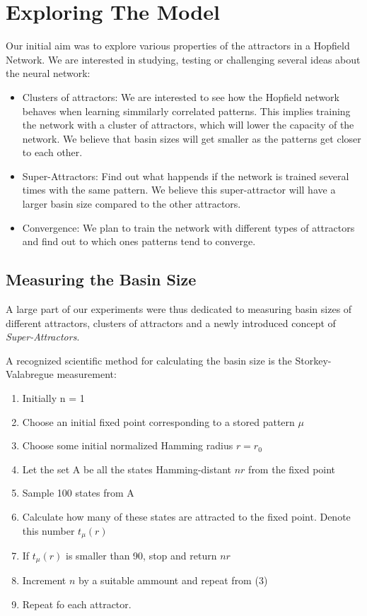 \chapter{Exploring The Model}

Our initial aim was to explore various properties of the attractors in a Hopfield Network. We are interested in studying, testing or challenging several ideas about the neural network:
\begin{itemize}
 \item Clusters of attractors: We are interested to see how the Hopfield network behaves when learning simmilarly correlated patterns. This implies training the network with a cluster of attractors, which will lower the capacity of the network. We believe that basin sizes will get smaller as the patterns get closer to each other. 
 \item Super-Attractors: Find out what happends if the network is trained several times with the same pattern. We believe this super-attractor will have a larger basin size compared to the other attractors.
 \item Convergence: We plan to train the network with different types of attractors and find out to which ones patterns tend to converge.  
\end{itemize}


\section{Measuring the Basin Size}

 A large part of our experiments were thus dedicated to measuring basin sizes of different attractors, clusters of attractors and a newly introduced concept of \emph{Super-Attractors}. 
 
 A recognized scientific method for calculating the basin size is the Storkey-Valabregue measurement:
 
 \begin{enumerate}
  \item Initially n = 1
  \item Choose an initial fixed point corresponding to a stored pattern \(\mu\)
  \item Choose some initial normalized Hamming radius \(r=r_{0}\)
  \item Let the set A be all the states Hamming-distant \( nr \) from the fixed point
  \item Sample 100 states from A
  \item Calculate how many of these states are attracted to the fixed point. Denote this number \( t_{\mu}(r) \)
  \item If \( t_{\mu}(r) \) is smaller than 90, stop and return \(nr\)
  \item Increment \(n\) by a suitable ammount and repeat from (3)
  \item Repeat fo each attractor.
 \end{enumerate}

